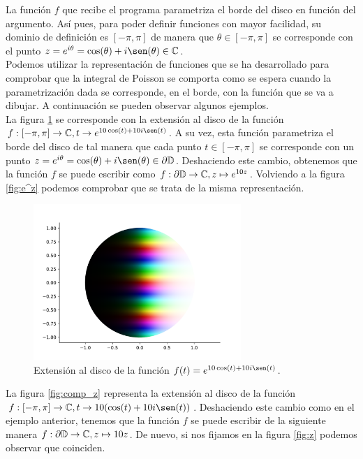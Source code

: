 La función $f$ que recibe el programa parametriza el borde del disco en función del argumento. Así pues, para poder definir funciones con mayor facilidad, su dominio de definición es $[-\pi, \pi]$ de manera que $\theta \in [-\pi, \pi]$ se corresponde con el punto $z = e^{i \theta} = \cos(\theta) + i \sen(\theta) \in \complex$. \\

Podemos utilizar la representación de funciones que se ha desarrollado para comprobar que la integral de Poisson se comporta como se espera cuando la parametrización dada se corresponde, en el borde, con la función que se va a dibujar. A continuación se pueden observar algunos ejemplos. \\

La figura \ref{fig:comp_e^z} se corresponde con la extensión al disco de la función $f : [-\pi, \pi] \to \complex, t \to e^{10 \cos(t)+10i \sen(t)}$. A su vez, esta función parametriza el borde del disco de tal manera que cada punto $t \in [-\pi, \pi]$ se corresponde con un punto $z = e^{i \theta} = \cos(\theta) + i \sen(\theta) \in \partial \disk$. Deshaciendo este cambio, obtenemos que la función $f$ se puede escribir como $f: \partial \mathbb{D} \to \mathbb{C}, z \mapsto e^{10z}$. Volviendo a la figura \ref{fig:e^z} podemos comprobar que se trata de la misma representación. \\

\begin{figure}[!htbp]
    \centering
    \includegraphics[width=0.7\textwidth]{../Aplicacion/e^(10cos(t)+10isen(t)).png}
    \caption{Extensión al disco de la función $f(t) = e^{10 \cos(t)+10i \sen(t)}$.}
    \label{fig:comp_e^z}
\end{figure}

La figura \ref{fig:comp_z} representa la extensión al disco de la función $f: [-\pi, \pi] \to \complex, t \to 10(\cos(t)+10i \sen(t))$. Deshaciendo este cambio como en el ejemplo anterior, tenemos que la función $f$ se puede escribir de la siguiente manera $f: \partial \mathbb{D} \to \mathbb{C}, z \mapsto 10z$. De nuevo, si nos fijamos en la figura \ref{fig:z} podemos observar que coinciden. \\


